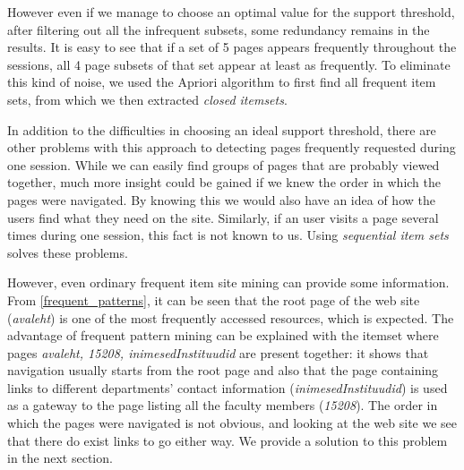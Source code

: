 \documentclass[12pt, english,a4paper]{article}
\begin{document}
However even if we manage to choose an optimal value for the support threshold, after filtering out all the infrequent subsets, some redundancy remains in the results. It is easy to see that if a set of 5 pages appears frequently throughout the sessions, all 4 page subsets of that set appear at least as frequently. To eliminate this kind of noise, we used the Apriori algorithm \cite{apriori} to first find all frequent item sets, from which we then extracted \emph{closed itemsets}.

In addition to the difficulties in choosing an ideal support threshold, there are other problems with this approach to detecting pages frequently requested during one session. While we can easily find groups of pages that are probably viewed together, much more insight could be gained if we knew the order in which the pages were navigated. By knowing this we would also have an idea of how the users find what they need on the site. Similarly, if an user visits a page several times during one session, this fact is not known to us. Using \emph{sequential item sets} solves these problems.

However, even ordinary frequent item site mining can provide some information. From \ref{frequent_patterns}, it can be seen that the root page of the web site (\emph{avaleht}) is one of the most frequently accessed resources, which is expected. The advantage of frequent pattern mining can be explained with the itemset where pages \emph{avaleht, 15208, inimesedInstituudid} are present together: it shows that navigation usually starts from the root page and also that the page containing links to different departments' contact information (\emph{inimesedInstituudid}) is used as a gateway to the page listing all the faculty members (\emph{15208}). The order in which the pages were navigated is not obvious, and looking at the web site we see that there do exist links to go either way. We provide a solution to this problem in the next section.
\end{document}
